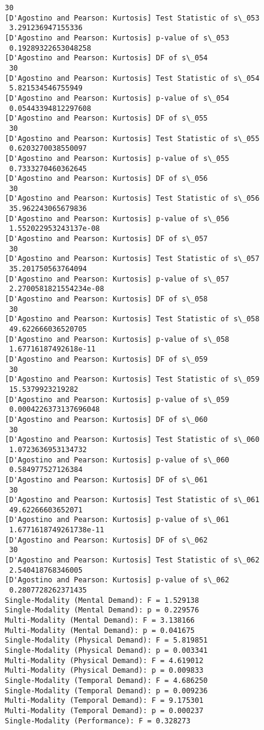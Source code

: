 \documentclass[11pt]{article}
\begin{document}
\begin{Verbatim}[commandchars=\\\{\}]
 30
[D'Agostino and Pearson: Kurtosis] Test Statistic of s\_053
 3.291236947155336
[D'Agostino and Pearson: Kurtosis] p-value of s\_053
 0.19289322653048258
[D'Agostino and Pearson: Kurtosis] DF of s\_054
 30
[D'Agostino and Pearson: Kurtosis] Test Statistic of s\_054
 5.821534546755949
[D'Agostino and Pearson: Kurtosis] p-value of s\_054
 0.05443394812297608
[D'Agostino and Pearson: Kurtosis] DF of s\_055
 30
[D'Agostino and Pearson: Kurtosis] Test Statistic of s\_055
 0.6203270038550097
[D'Agostino and Pearson: Kurtosis] p-value of s\_055
 0.7333270460362645
[D'Agostino and Pearson: Kurtosis] DF of s\_056
 30
[D'Agostino and Pearson: Kurtosis] Test Statistic of s\_056
 35.962243065679836
[D'Agostino and Pearson: Kurtosis] p-value of s\_056
 1.552022953243137e-08
[D'Agostino and Pearson: Kurtosis] DF of s\_057
 30
[D'Agostino and Pearson: Kurtosis] Test Statistic of s\_057
 35.201750563764094
[D'Agostino and Pearson: Kurtosis] p-value of s\_057
 2.2700581821554234e-08
[D'Agostino and Pearson: Kurtosis] DF of s\_058
 30
[D'Agostino and Pearson: Kurtosis] Test Statistic of s\_058
 49.622666036520705
[D'Agostino and Pearson: Kurtosis] p-value of s\_058
 1.67716187492618e-11
[D'Agostino and Pearson: Kurtosis] DF of s\_059
 30
[D'Agostino and Pearson: Kurtosis] Test Statistic of s\_059
 15.5379923219282
[D'Agostino and Pearson: Kurtosis] p-value of s\_059
 0.0004226373137696048
[D'Agostino and Pearson: Kurtosis] DF of s\_060
 30
[D'Agostino and Pearson: Kurtosis] Test Statistic of s\_060
 1.0723636953134732
[D'Agostino and Pearson: Kurtosis] p-value of s\_060
 0.584977527126384
[D'Agostino and Pearson: Kurtosis] DF of s\_061
 30
[D'Agostino and Pearson: Kurtosis] Test Statistic of s\_061
 49.62266603652071
[D'Agostino and Pearson: Kurtosis] p-value of s\_061
 1.6771618749261738e-11
[D'Agostino and Pearson: Kurtosis] DF of s\_062
 30
[D'Agostino and Pearson: Kurtosis] Test Statistic of s\_062
 2.540418768346005
[D'Agostino and Pearson: Kurtosis] p-value of s\_062
 0.2807728262371435
Single-Modality (Mental Demand): F = 1.529138
Single-Modality (Mental Demand): p = 0.229576
Multi-Modality (Mental Demand): F = 3.138166
Multi-Modality (Mental Demand): p = 0.041675
Single-Modality (Physical Demand): F = 5.819851
Single-Modality (Physical Demand): p = 0.003341
Multi-Modality (Physical Demand): F = 4.619012
Multi-Modality (Physical Demand): p = 0.009833
Single-Modality (Temporal Demand): F = 4.686250
Single-Modality (Temporal Demand): p = 0.009236
Multi-Modality (Temporal Demand): F = 9.175301
Multi-Modality (Temporal Demand): p = 0.000237
Single-Modality (Performance): F = 0.328273

\end{Verbatim}
\end{document}
